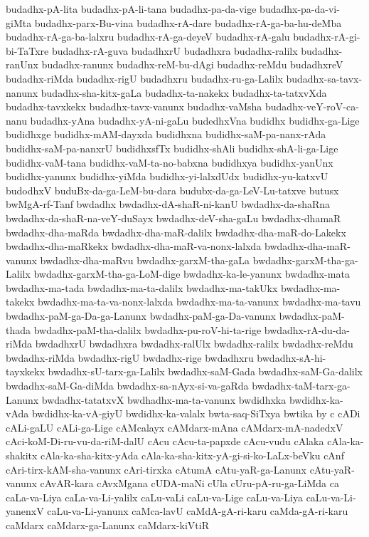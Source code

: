 {budadhx-pA-lita
budadhx-pA-li-tana
budadhx-pa-da-vige
budadhx-pa-da-vi-giMta
budadhx-parx-Bu-vina
budadhx-rA-dare
budadhx-rA-ga-ba-hu-deMba
budadhx-rA-ga-ba-lalxru
budadhx-rA-ga-deyeV
budadhx-rA-galu
budadhx-rA-gi-bi-TaTxre
budadhx-rA-guva
budadhxrU
budadhxra
budadhx-ralilx
budadhx-ranUnx
budadhx-ranunx
budadhx-reM-bu-dAgi
budadhx-reMdu
budadhxreV
budadhx-riMda
budadhx-rigU
budadhxru
budadhx-ru-ga-Lalilx
budadhx-sa-tavx-nanunx
budadhx-sha-kitx-gaLa
budadhx-ta-nakekx
budadhx-ta-tatxvXda
budadhx-tavxkekx
budadhx-tavx-vanunx
budadhx-vaMsha
budadhx-veY-roV-ca-nanu
budadhx-yAna
budadhx-yA-ni-gaLu
budedhxVna
budidhx
budidhx-ga-Lige
budidhxge
budidhx-mAM-dayxda
budidhxna
budidhx-saM-pa-nanx-rAda
budidhx-saM-pa-nanxrU
budidhxsfTx
budidhx-shAli
budidhx-shA-li-ga-Lige
budidhx-vaM-tana
budidhx-vaM-ta-no-babxna
budidhxya
budidhx-yanUnx
budidhx-yanunx
budidhx-yiMda
budidhx-yi-lalxdUdx
budidhx-yu-katxvU
budodhxV
buduBx-da-ga-LeM-bu-dara
budubx-da-ga-LeV-Lu-tatxve
butusx
bwMgA-rf-Tanf
bwdadhx
bwdadhx-dA-shaR-ni-kanU
bwdadhx-da-shaRna
bwdadhx-da-shaR-na-veY-duSayx
bwdadhx-deV-sha-gaLu
bwdadhx-dhamaR
bwdadhx-dha-maRda
bwdadhx-dha-maR-dalilx
bwdadhx-dha-maR-do-Lakekx
bwdadhx-dha-maRkekx
bwdadhx-dha-maR-va-nonx-lalxda
bwdadhx-dha-maR-vanunx
bwdadhx-dha-maRvu
bwdadhx-garxM-tha-gaLa
bwdadhx-garxM-tha-ga-Lalilx
bwdadhx-garxM-tha-ga-LoM-dige
bwdadhx-ka-le-yanunx
bwdadhx-mata
bwdadhx-ma-tada
bwdadhx-ma-ta-dalilx
bwdadhx-ma-takUkx
bwdadhx-ma-takekx
bwdadhx-ma-ta-va-nonx-lalxda
bwdadhx-ma-ta-vanunx
bwdadhx-ma-tavu
bwdadhx-paM-ga-Da-ga-Lanunx
bwdadhx-paM-ga-Da-vanunx
bwdadhx-paM-thada
bwdadhx-paM-tha-dalilx
bwdadhx-pu-roV-hi-ta-rige
bwdadhx-rA-du-da-riMda
bwdadhxrU
bwdadhxra
bwdadhx-ralUlx
bwdadhx-ralilx
bwdadhx-reMdu
bwdadhx-riMda
bwdadhx-rigU
bwdadhx-rige
bwdadhxru
bwdadhx-sA-hi-tayxkekx
bwdadhx-sU-tarx-ga-Lalilx
bwdadhx-saM-Gada
bwdadhx-saM-Ga-dalilx
bwdadhx-saM-Ga-diMda
bwdadhx-sa-nAyx-si-va-gaRda
bwdadhx-taM-tarx-ga-Lanunx
bwdadhx-tatatxvX
bwdhadhx-ma-ta-vanunx
bwdidhxka
bwdidhx-ka-vAda
bwdidhx-ka-vA-giyU
bwdidhx-ka-valalx
bwta-saq-SiTxya
bwtika
by
c
cADi
cALi-gaLU
cALi-ga-Lige
cAMcalayx
cAMdarx-mAna
cAMdarx-mA-nadedxV
cAci-koM-Di-ru-vu-da-riM-dalU
cAcu
cAcu-ta-papxde
cAcu-vudu
cAlaka
cAla-ka-shakitx
cAla-ka-sha-kitx-yAda
cAla-ka-sha-kitx-yA-gi-si-ko-LaLx-beVku
cAnf
cAri-tirx-kAM-sha-vanunx
cAri-tirxka
cAtumA
cAtu-yaR-ga-Lanunx
cAtu-yaR-vanunx
cAvAR-kara
cAvxMgana
cUDA-maNi
cUla
cUru-pA-ru-ga-LiMda
ca
caLa-va-Liya
caLa-va-Li-yalilx
caLu-vaLi
caLu-va-Lige
caLu-va-Liya
caLu-va-Li-yanenxV
caLu-va-Li-yanunx
caMca-lavU
caMdA-gA-ri-karu
caMda-gA-ri-karu
caMdarx
caMdarx-ga-Lanunx
caMdarx-kiVtiR
}

